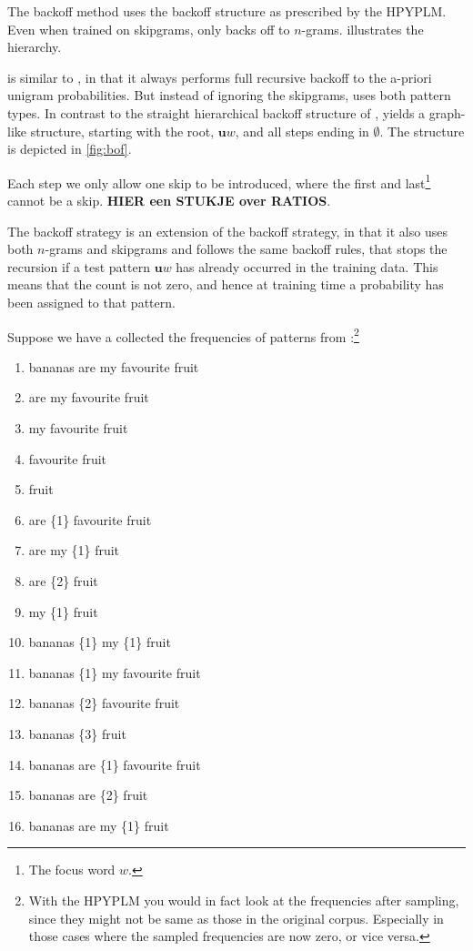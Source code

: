 The \BON backoff method uses the backoff structure as prescribed by the HPYPLM. Even when trained on skipgrams, \BON only backs off to $n$-grams.  illustrates the \BON hierarchy.



\BOF is similar to \BON, in that it always performs full recursive backoff to the a-priori unigram probabilities. But instead of ignoring the skipgrams, \BOF uses both pattern types. In contrast to the straight hierarchical backoff structure of \BON, \BOF yields a graph-like structure, starting with the root, $\mathbf{u}w$, and all steps ending in $\emptyset$. The structure is depicted in \cref{fig:bof}.



Each step we only allow one skip to be introduced, where the first and last\footnote{The focus word $w$.} cannot be a skip. \textbf{HIER een STUKJE over RATIOS}.

The \BOL backoff strategy is an extension of the \BOF backoff strategy, in that it also uses both $n$-grams and skipgrams and follows the same backoff rules, that stops the recursion if a test pattern $\mathbf{u}w$ has already occurred in the training data. This means that the count is not zero, and hence at training time a probability has been assigned to that pattern.

Suppose we have a collected the frequencies of patterns from \obw:\footnote{With the HPYPLM you would in fact look at the frequencies after sampling, since they might not be same as those in the original corpus. Especially in those cases where the sampled frequencies are now zero, or vice versa.}
\begin{multicols}{2}\begin{enumerate}
	\item[0] bananas are my favourite fruit
	\item[1] are my favourite fruit
	\item[2] my favourite fruit 
	\item[7] favourite fruit
	\item[15391] fruit
	\item[1] are \{1\} favourite fruit
	\item[1] are my \{1\} fruit
	\item[90] are \{2\} fruit
	\item[13] my \{1\} fruit
	\item[0] bananas \{1\} my \{1\} fruit
	\item[0] bananas \{1\} my favourite fruit
	\item[0] bananas \{2\} favourite fruit
	\item[4] bananas \{3\} fruit
	\item[0] bananas are \{1\} favourite fruit
	\item[0] bananas are \{2\} fruit
	\item[0] bananas are my \{1\} fruit
\end{enumerate}\label{enum:minicorpus}\end{multicols}


